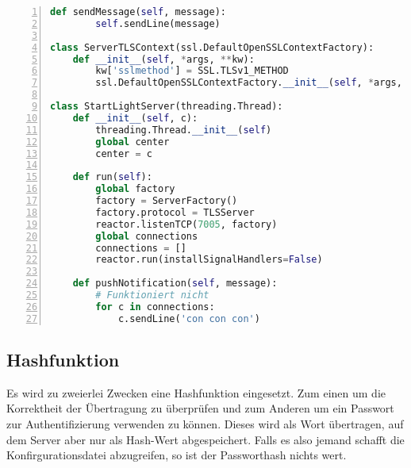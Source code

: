 \begin{lstlisting}[caption =Implementierung des SSL Servers, language=python, frame=single, breaklines=true,columns=fullflexible, commentstyle=\color{gray}\upshape, captionpos=b, numbers = left]
    def sendMessage(self, message):
        self.sendLine(message)

class ServerTLSContext(ssl.DefaultOpenSSLContextFactory):
    def __init__(self, *args, **kw):
        kw['sslmethod'] = SSL.TLSv1_METHOD
        ssl.DefaultOpenSSLContextFactory.__init__(self, *args, **kw)

class StartLightServer(threading.Thread):
    def __init__(self, c):
        threading.Thread.__init__(self)
        global center
        center = c

    def run(self):
        global factory
        factory = ServerFactory()
        factory.protocol = TLSServer
        reactor.listenTCP(7005, factory)
        global connections
        connections = []
        reactor.run(installSignalHandlers=False)

    def pushNotification(self, message):
        # Funktioniert nicht
        for c in connections:
            c.sendLine('con con con')

\end{lstlisting}


\subsection{Hashfunktion}
Es wird zu zweierlei Zwecken eine Hashfunktion eingesetzt. Zum einen um die Korrektheit der Übertragung zu überprüfen und zum Anderen um ein Passwort zur Authentifizierung verwenden zu können. Dieses wird als Wort übertragen, auf dem Server aber nur als Hash-Wert abgespeichert. Falls es also jemand schafft die Konfirgurationsdatei abzugreifen, so ist der Passworthash nichts wert. 

